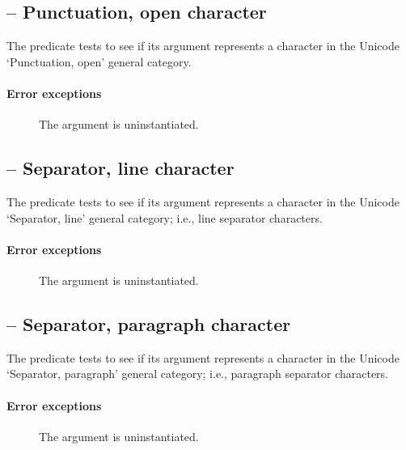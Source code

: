 \subsection{ -- Punctuation, open character}
\label{chars:isPsChar}

The  predicate tests to see if its  argument represents a character in the Unicode `Punctuation, open' general category. 
        
\paragraph{Error exceptions}
\begin{description}
\item[]
The argument is uninstantiated.
\end{description}

\subsection{ -- Separator, line character}
\label{chars:isZlChar}

The  predicate tests to see if its  argument represents a character in the Unicode `Separator, line' general category; i.e., line separator characters.
        
\paragraph{Error exceptions}
\begin{description}
\item[]
The argument is uninstantiated.
\end{description}

\subsection{ -- Separator, paragraph character}
\label{chars:isZpChar}

The  predicate tests to see if its  argument represents a character in the Unicode `Separator, paragraph' general category; i.e., paragraph separator characters.
        
\paragraph{Error exceptions}
\begin{description}
\item[]
The argument is uninstantiated.
\end{description}

